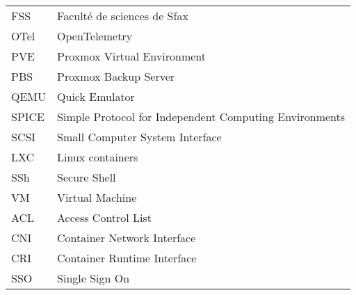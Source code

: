 \begin{longtable*}{p{3cm}p{10cm}}
	FSS & Faculté de sciences de Sfax \\
	OTel & OpenTelemetry \\
	PVE & Proxmox Virtual Environment \\
	PBS & Proxmox Backup Server \\
	QEMU & Quick Emulator \\
	SPICE & Simple Protocol for Independent Computing Environments \\
	SCSI & Small Computer System Interface \\
	LXC & Linux containers \\
	SSh & Secure Shell \\
	VM & Virtual Machine \\
	ACL & Access Control List \\
	CNI & Container Network Interface \\
	CRI & Container Runtime Interface \\
	SSO & Single Sign On \\
\end{longtable*}
